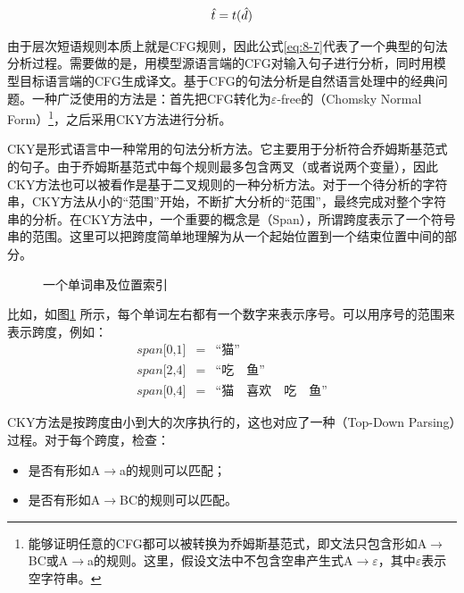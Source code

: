 \begin{eqnarray}
\hat{{t}}=t(\hat{d})
\label{eq:8-8}
\end{eqnarray}

\parinterval 由于层次短语规则本质上就是CFG规则，因此公式\eqref{eq:8-7}代表了一个典型的句法分析过程。需要做的是，用模型源语言端的CFG对输入句子进行分析，同时用模型目标语言端的CFG生成译文。基于CFG的句法分析是自然语言处理中的经典问题。一种广泛使用的方法是：首先把CFG转化为$\varepsilon$-free的{\small{}}（Chomsky Normal Form）\footnote[5]{能够证明任意的CFG都可以被转换为乔姆斯基范式，即文法只包含形如A$\to$BC或A$\to$a的规则。这里，假设文法中不包含空串产生式A$\to\varepsilon$，其中$\varepsilon$表示空字符串。}，之后采用CKY方法进行分析。

\parinterval CKY是形式语言中一种常用的句法分析方法。它主要用于分析符合乔姆斯基范式的句子。由于乔姆斯基范式中每个规则最多包含两叉（或者说两个变量），因此CKY方法也可以被看作是基于二叉规则的一种分析方法。对于一个待分析的字符串，CKY方法从小的“范围”开始，不断扩大分析的“范围”，最终完成对整个字符串的分析。在CKY方法中，一个重要的概念是{\small{}}（Span），所谓跨度表示了一个符号串的范围。这里可以把跨度简单地理解为从一个起始位置到一个结束位置中间的部分。

\begin{figure}[htp]
\centering

\caption{一个单词串及位置索引}
\label{fig:8-8}
\end{figure}

比如，如图\ref{fig:8-8} 所示，每个单词左右都有一个数字来表示序号。可以用序号的范围来表示跨度，例如：
\begin{eqnarray}
span\textrm{[0,1]}&=&\textrm{“猫”} \nonumber \\
span\textrm{[2,4]}&=&\textrm{“吃} \quad \textrm{鱼”} \nonumber \\
span\textrm{[0,4]}&=&\textrm{“猫} \quad \textrm{喜欢} \quad \textrm{吃} \quad \textrm{鱼”} \nonumber
\end{eqnarray}

\parinterval CKY方法是按跨度由小到大的次序执行的，这也对应了一种{\small{}}（Top-Down Parsing）过程。对于每个跨度，检查：

\begin{itemize}
\vspace{0.5em}
\item 	是否有形如A$\to$a的规则可以匹配；
\vspace{0.5em}
\item 	是否有形如A$\to$BC的规则可以匹配。
\vspace{0.5em}
\end{itemize}

